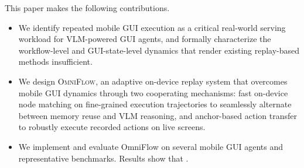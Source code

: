 
This paper makes the following contributions.

\begin{itemize}
    \item We identify repeated mobile GUI execution as a critical real-world serving workload for VLM-powered GUI agents, and formally characterize the workflow-level and GUI-state-level dynamics that render existing replay-based methods insufficient.
    \item We design \textsc{OmniFlow}, an adaptive on-device replay system that overcomes mobile GUI dynamics through two cooperating mechanisms: fast on-device node matching on fine-grained execution trajectories to seamlessly alternate between memory reuse and VLM reasoning, and anchor-based action transfer to robustly execute recorded actions on live screens.
    \item We implement and evaluate OmniFlow on several mobile GUI agents and representative benchmarks. Results show that .
\end{itemize}
